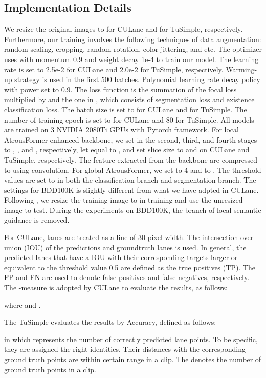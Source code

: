 \documentclass[preprint,12pt,review]{elsarticle}
\begin{document}
\subsection{Implementation Details}
We resize the original images to  for CULane and  for TuSimple, respectively. Furthermore, our training involves the following techniques of data augmentation: random scaling, cropping, random rotation, color jittering, and etc.
The optimizer uses  with momentum 0.9 and weight decay 1e-4 to train our model. The learning rate is set to 2.5e-2 for CULane and 2.0e-2 for TuSimple, respectively. Warming-up strategy is used in the first 500 batches. Polynomial learning rate decay policy with power set to 0.9. The loss function is the summation of the focal loss multiplied by  and the one in \cite{SCNN,resa}, which consists of segmentation  loss and existence classification  loss. The batch size is set to  for CULane and  for TuSimple. The number of training epoch is set to  for CULane and 80 for TuSimple. All models are trained on 3 NVIDIA 2080Ti GPUs with Pytorch framework. For local AtrousFormer enhanced backbone, we set  in the second, third, and fourth stages to , , and , respectively, let  equal to , and set slice size to  and  on CULane and TuSimple, respectively. The feature extracted from the backbone are compressed to  using  convolution. For global AtrousFormer, we set  to 4 and  to . The threshold values are set to  in both the classification branch and segmentation branch. The settings for BDD100K is slightly different from what we have adpted in CULane. Following \cite{distillation}, we resize the training image to  in training and use the unresized image to test. During the experiments on BDD100K, the branch of local semantic guidance is removed.

For CULane, lanes are treated as a line of 30-pixel-width. The intersection-over-union (IOU) of the predictions and groundtruth lanes is used. In general, the predicted lanes that have a IOU with their corresponding targets larger or equivalent to the threshold value 0.5 are defined as the true positives (TP). The FP and FN are used to denote false positives and false negatives, respectively. The -measure is adopted by CULane to evaluate the results, as follows:

where  and .

The TuSimple evaluates the results by Accuracy, defined as follows:

in which  represents the number of correctly predicted lane points. To be specific, they are assigned the right identities. Their distances with the corresponding ground truth points are within certain range in a clip. The  denotes the number of ground truth points in a clip.
\end{document}
